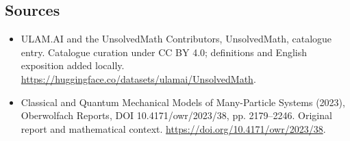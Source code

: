 \documentclass[11pt]{article}
\begin{document}
\subsection{Sources}
\begin{itemize}
\item[\hypertarget{source:statement:1}{S1}] ULAM.AI and the UnsolvedMath Contributors, UnsolvedMath, catalogue entry. Catalogue curation under CC BY 4.0; definitions and English exposition added locally.
\url{https://huggingface.co/datasets/ulamai/UnsolvedMath}.
\item[\hypertarget{source:statement:2}{S2}] Classical and Quantum Mechanical Models of Many-Particle Systems (2023), Oberwolfach Reports, DOI 10.4171/owr/2023/38, pp. 2179--2246. Original report and mathematical context.
\url{https://doi.org/10.4171/owr/2023/38}.
\end{itemize}
\label{end:statement}
\end{document}
